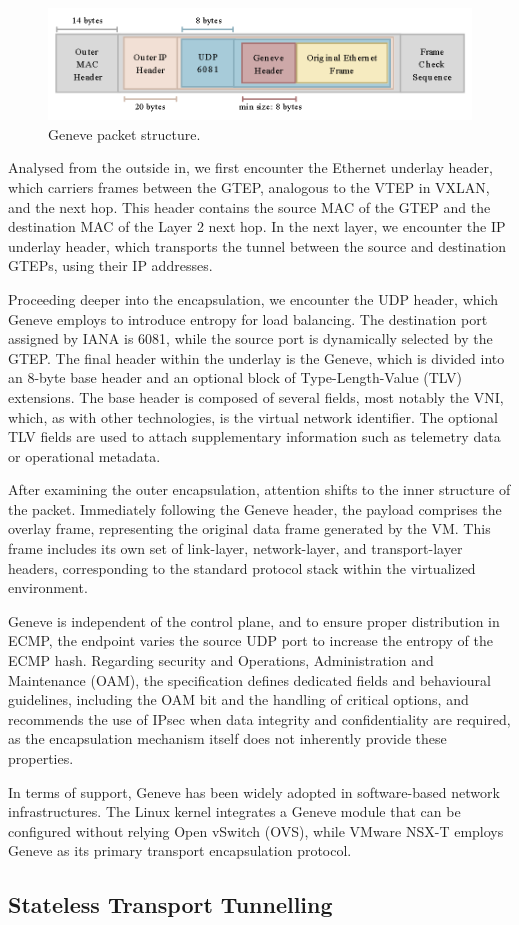 \begin{figure} [H]
    \centering
    \includegraphics[width=0.65\linewidth]{Figures/genevePacket.png}
    \caption{Geneve packet structure. \cite{Geneve}}
    \label{geneve}
\end{figure}

Analysed from the outside in, we first encounter the Ethernet underlay header, which carriers frames between the GTEP, analogous to the VTEP in VXLAN, and the next hop. This header contains the source MAC of the GTEP and the destination MAC of the Layer 2 next hop. In the next layer, we encounter the IP underlay header, which transports the tunnel between the source and destination GTEPs, using their IP addresses.

Proceeding deeper into the encapsulation, we encounter the UDP header, which Geneve employs to introduce entropy for load balancing. The destination port assigned by IANA is 6081, while the source port is dynamically selected by the GTEP. The final header within the underlay is the Geneve, which is divided into an 8-byte base header and an optional block of Type-Length-Value (TLV) extensions. The base header is composed of several fields, most notably the VNI, which, as with other technologies, is the virtual network identifier. The optional TLV fields are used to attach supplementary information such as telemetry data or operational metadata.

After examining the outer encapsulation, attention shifts to the inner structure of the packet. Immediately following the Geneve header, the payload comprises the overlay frame, representing the original data frame generated by the VM. This frame includes its own set of link-layer, network-layer, and transport-layer headers, corresponding to the standard protocol stack within the virtualized environment.

Geneve is independent of the control plane, and to ensure proper distribution in ECMP, the endpoint varies the source UDP port to increase the entropy of the ECMP hash. Regarding security and Operations, Administration and Maintenance (OAM), the specification defines dedicated fields and behavioural guidelines, including the OAM bit and the handling of critical options, and recommends the use of IPsec when data integrity and confidentiality are required, as the encapsulation mechanism itself does not inherently provide these properties. 

In terms of support, Geneve has been widely adopted in software-based network infrastructures. The Linux kernel integrates a Geneve module that can be configured without relying Open vSwitch (OVS), while VMware NSX-T employs Geneve as its primary transport encapsulation protocol.

\subsection{Stateless Transport Tunnelling}

